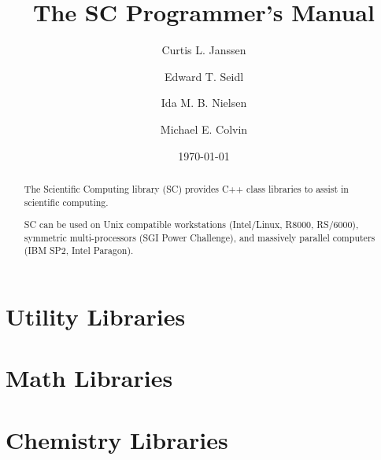 \documentclass{report}
\begin{document}
\title{The SC Programmer's Manual}

\author{Curtis L. Janssen \and Edward T. Seidl \and Ida M. B. Nielsen
        \and Michael E. Colvin}

\date{\today}

\maketitle

\begin{abstract}
The Scientific Computing library (SC) provides C++ class libraries
to assist in scientific computing.

SC can be used on Unix compatible workstations (Intel/Linux, R8000,
RS/6000), symmetric multi-processors (SGI Power Challenge), and
massively parallel computers (IBM SP2, Intel Paragon).
\end{abstract}

\tableofcontents

\part{Utility Libraries}








\part{Math Libraries}





\part{Chemistry Libraries}



\printindex
\end{document}

